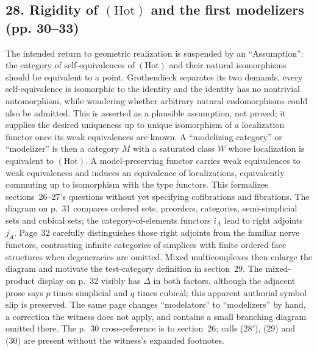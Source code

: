 \documentclass[10pt,oneside]{book}
\begin{document}
\subsection*{28. Rigidity of $(\mathrm{Hot})$ and the first modelizers (pp. 30--33)}
The intended return to geometric realization is suspended by an ``Assumption'': the category of self-equivalences of $(\mathrm{Hot})$ and their natural isomorphisms should be equivalent to a point. Grothendieck separates its two demands, every self-equivalence is isomorphic to the identity and the identity has no nontrivial automorphism, while wondering whether arbitrary natural endomorphisms could also be admitted. This is asserted as a plausible assumption, not proved; it supplies the desired uniqueness up to unique isomorphism of a localization functor once its weak equivalences are known. A ``modelizing category'' or ``modelizer'' is then a category $M$ with a saturated class $W$ whose localization is equivalent to $(\mathrm{Hot})$. A model-preserving functor carries weak equivalences to weak equivalences and induces an equivalence of localizations, equivalently commuting up to isomorphism with the type functors. This formalizes sections~26--27's questions without yet specifying cofibrations and fibrations. The diagram on p.~31 compares ordered sets, preorders, categories, semi-simplicial sets and cubical sets; the category-of-elements functors $i_A$ lead to right adjoints $j_A$. Page~32 carefully distinguishes those right adjoints from the familiar nerve functors, contrasting infinite categories of simplices with finite ordered face structures when degeneracies are omitted. Mixed multicomplexes then enlarge the diagram and motivate the test-category definition in section~29. The mixed-product display on p.~32 visibly has $\Delta$ in both factors, although the adjacent prose says $p$ times simplicial and $q$ times cubical; this apparent authorial symbol slip is preserved. The same page changes ``modelators'' to ``modelizers'' by hand, a correction the witness does not apply, and contains a small branching diagram omitted there. The p.~30 cross-reference is to section~26; calls (28$'$), (29) and (30) are present without the witness's expanded footnotes.
\end{document}
